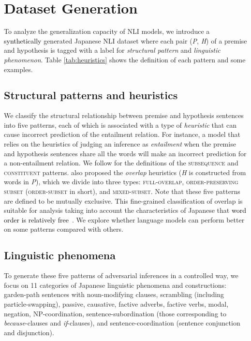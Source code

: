 \documentclass[11pt]{article}
\newcommand{\todo}[1]{\textcolor{black}{#1}}
\newcommand{\HLabel}[1]{\textsc{#1}}
\begin{document}
\section{Dataset Generation}
\label{sec:dataset}

To analyze the generalization capacity of NLI models, we introduce
a \todo{synthetically} generated Japanese NLI dataset
where each pair (\textit{P}, \textit{H}) of a premise and hypothesis
is tagged with a label for \textit{structural pattern} and \textit{linguistic phenomenon}.
Table \ref{tab:heuristics} shows the definition of each pattern and some examples.
 
\subsection{Structural patterns and heuristics}
We classify the structural relationship between premise and hypothesis sentences into five patterns, 
each of which is associated with a type of \textit{heuristic} that can cause
incorrect prediction of the entailment relation.
For instance, a model that relies on the heuristics of judging an inference
as \textit{entailment} when the premise and hypothesis sentences
share all the words will make an incorrect prediction for a non-entailment relation.
We follow  for the definitions of the \HLabel{subsequence} and \HLabel{constituent} patterns.
 also proposed the \textit{overlap} heuristics 
(\textit{H} is constructed from words in \textit{P}),
which we divide into three types:
\HLabel{full-overlap},
\HLabel{order-preserving subset} (\HLabel{order-subset} in short),
and 
\HLabel{mixed-subset}.
Note that these five patterns are defined to be mutually exclusive.
This fine-grained classification of overlap 
is suitable for analysis taking into account the characteristics
of Japanese that \todo{word order is relatively free~\cite{hinds1986,shibatani1990languages}}.
We explore whether language models can perform better on some patterns
compared with others.


\subsection{Linguistic phenomena}
\label{ssec:phenomena}
To generate these five patterns of adversarial inferences
in a controlled way, 
we focus on 11 categories of Japanese linguistic phenomena and constructions:
garden-path sentences with noun-modifying clauses,
scrambling (including particle-swapping), 
passive, causative, factive adverbs, factive verbs,
modal, negation, NP-coordination,
sentence-subordination (those corresponding to \textit{because}-clauses
and \textit{if}-clauses),
and sentence-coordination (sentence conjunction and disjunction).
\end{document}
